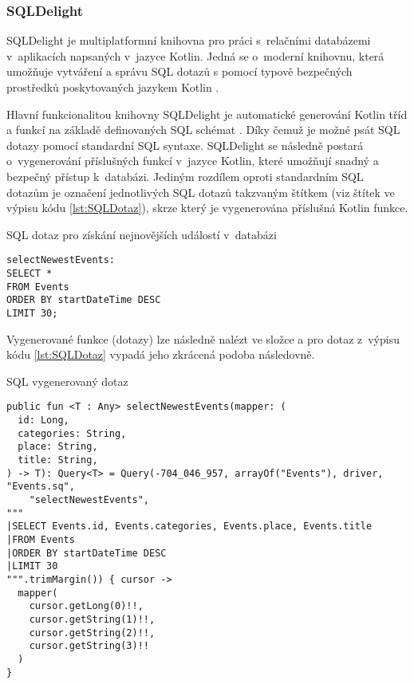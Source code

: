 \subsubsection*{SQLDelight}
SQLDelight je multiplatformní knihovna pro práci s~relačními databázemi v~aplikacích napsaných v~jazyce Kotlin. Jedná se o~moderní knihovnu, 
která umožňuje vytváření a správu SQL dotazů s pomocí typově bezpečných prostředků poskytovaných jazykem Kotlin \cite{sqldelight}.

\medskip

Hlavní funkcionalitou knihovny SQLDelight je automatické generování Kotlin tříd a funkcí na základě definovaných SQL schémat \cite{sqldelight}. Díky čemuž
je možné psát SQL dotazy pomocí standardní SQL syntaxe. SQLDelight se následně postará o~vygenerování příslušných funkcí v~jazyce Kotlin, které
umožňují  snadný a bezpečný přístup k~databázi. Jediným rozdílem oproti standardním SQL dotazům je označení jednotlivých SQL dotazů takzvaným 
štítkem (viz štítek  ve výpisu kódu \ref{lst:SQLDotaz}), skrze který je vygenerována příslušná Kotlin funkce. 

\begin{listing}[H]
\caption{SQL dotaz pro získání nejnovějších událostí v~databázi}\label{lst:SQLDotaz}
\begin{verbatim}
selectNewestEvents:
SELECT *
FROM Events
ORDER BY startDateTime DESC
LIMIT 30;
\end{verbatim}
\end{listing}

Vygenerované funkce (dotazy) lze následně nalézt ve složce  a pro dotaz z~výpisu kódu \ref{lst:SQLDotaz}
vypadá jeho zkrácená podoba následovně.

\begin{listing}[H]
\caption{SQL vygenerovaný dotaz}\label{lst:SQLGeneratedDotaz}
\begin{verbatim}
public fun <T : Any> selectNewestEvents(mapper: (
  id: Long,
  categories: String,
  place: String,
  title: String,
) -> T): Query<T> = Query(-704_046_957, arrayOf("Events"), driver, "Events.sq",
    "selectNewestEvents", 
"""
|SELECT Events.id, Events.categories, Events.place, Events.title
|FROM Events
|ORDER BY startDateTime DESC
|LIMIT 30
""".trimMargin()) { cursor ->
  mapper(
    cursor.getLong(0)!!,
    cursor.getString(1)!!,
    cursor.getString(2)!!,
    cursor.getString(3)!!
  )
}
\end{verbatim}
\end{listing}

